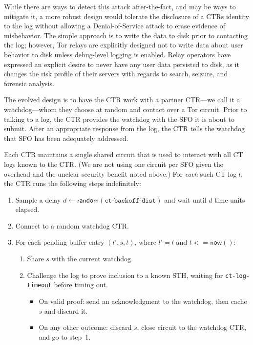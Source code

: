 While there are ways to detect this attack after-the-fact, and may be ways to mitigate
it, a more robust design would tolerate the disclosure of a CTRs identity to the log
without allowing a Denial-of-Service attack to erase evidence of misbehavior.  The
simple approach is to write the data to disk prior to contacting the log; however, Tor relays
are explicitly designed not to write data about user behavior to disk unless
debug-level logging is enabled. Relay operators have expressed an explicit desire
to never have any user data persisted to disk, as it changes the risk profile of
their servers with regards to search, seizure, and forensic analysis.

The evolved design is to have the CTR work with a partner CTR---we call it
a watchdog---whom they choose at random and contact over a Tor circuit. Prior to talking
to a log, the CTR provides the watchdog with the SFO it is about to submit. After
an appropriate response from the log, the CTR tells the watchdog that SFO has been
adequately addressed.

Each CTR maintains a single shared circuit that is used to interact with all CT
logs known to the CTR\@. (We are not using one circuit per SFO given the overhead and the unclear security benefit noted above.) For \emph{each} such CT log $l$, the
CTR runs the following steps indefinitely:
\begin{enumerate}
    \item\label{enm:auditing:backoff} Sample a delay $d \gets
        \mathsf{random}(\texttt{ct-backoff-dist})$ and wait until $d$ time units
        elapsed.
    \item Connect to a random watchdog CTR\@.
    \item\label{enm:auditing:loop} For each pending buffer entry $(l',s,t)$,
    where $l' = l$ and $t <= \mathsf{now}()$:
		\begin{enumerate}
			\item\label{enm:ext:auditing:watchdog} Share $s$ with the current
				watchdog.
			\item\label{enm:ext:auditing:challenge} Challenge the log to prove
                                  inclusion to a known STH, waiting for \texttt{ct-log-timeout} before
                                  timing out.
				\begin{itemize}
					\item\label{enm:ext:auditing:challenge:success} On valid
						proof: send an acknowledgment to the watchdog, then
						cache $s$ and discard it.
					\item\label{enm:ext:auditing:challenge:fail} On any other
						outcome: discard $s$, close circuit to the watchdog CTR,
						and go to step~1.
				\end{itemize}
		\end{enumerate}
\end{enumerate}

